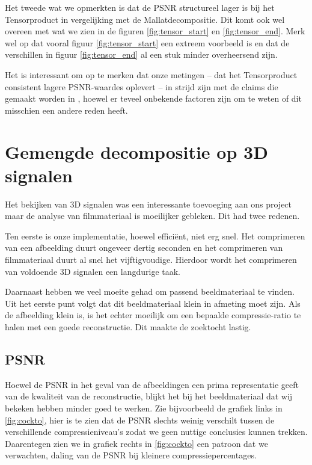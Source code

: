 Het tweede wat we opmerkten is dat de PSNR structureel lager is bij het Tensorproduct in vergelijking 
met de Mallatdecompositie. Dit komt ook wel overeen met wat we zien in de figuren \ref{fig:tensor_start} 
en \ref{fig:tensor_end}. Merk wel op dat vooral figuur \ref{fig:tensor_start} een extreem voorbeeld 
is en dat de verschillen in figuur \ref{fig:tensor_end} al een stuk minder overheersend zijn.

Het is interessant om op te merken dat onze metingen -- dat het Tensorproduct consistent lagere 
PSNR-waardes oplevert -- in strijd zijn met de claims die gemaakt worden in \cite{tensor_vs_mallat}, 
hoewel er teveel onbekende factoren zijn om te weten of dit misschien een andere reden heeft.

\section{Gemengde decompositie op 3D signalen}
Het bekijken van 3D signalen was een interessante toevoeging aan ons project maar de analyse  
van filmmateriaal is moeilijker gebleken. Dit had twee redenen.

Ten eerste is onze implementatie, hoewel effici\"ent, niet erg snel. Het comprimeren van een 
afbeelding duurt ongeveer dertig seconden en het comprimeren van filmmateriaal duurt al snel het 
vijftigvoudige. Hierdoor wordt het comprimeren van voldoende 3D signalen een langdurige taak.

Daarnaast hebben we veel moeite gehad om passend beeldmateriaal te vinden. Uit het eerste punt volgt 
dat dit beeldmateriaal klein in afmeting moet zijn. Als de afbeelding klein is, is het echter moeilijk
om een bepaalde compressie-ratio te halen met een goede reconstructie. Dit maakte de zoektocht lastig.

\subsection{PSNR}
Hoewel de PSNR in het geval van de afbeeldingen een prima representatie geeft van de kwaliteit van de 
reconstructie, blijkt het bij het beeldmateriaal dat wij bekeken hebben minder goed te werken. 
Zie bijvoorbeeld de grafiek links in \ref{fig:cockto}, hier is te zien dat de PSNR slechts weinig verschilt
tussen de verschillende compressieniveau's zodat we geen nuttige conclusies kunnen trekken.
Daarentegen zien we in grafiek rechts in \ref{fig:cockto} een patroon dat we verwachten, daling van de PSNR
bij kleinere compressiepercentages.

